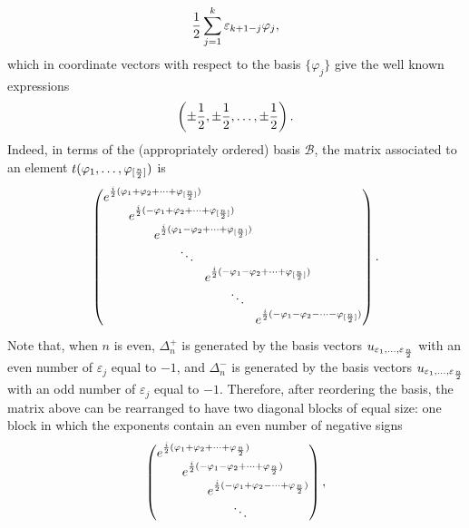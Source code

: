 \documentclass[pdftex]{sigma}
\numberwithin{equation}{section}
\begin{document}
\begin{gather*}{1\over 2}\sum_{j=1}^{k}\varepsilon_{k+1-j}\varphi_j,\end{gather*}
which in coordinate vectors with respect to the basis $\{\varphi_j\}$ give the well known expressions
\begin{gather*}\left(\pm{1\over 2},\pm{1\over 2},\dots,\pm{1\over 2}\right).\end{gather*}
Indeed, in terms of the (appropriately ordered) basis $\mathcal{B}$, the matrix associated to an element $t(\varphi_1,\dots,\varphi_{[{n\over 2}]})$ is
\begin{gather*}
\left(\begin{array}{@{}l@{}}
e^{{i\over 2}(\varphi_1+\varphi_2+\cdots+\varphi_{[{n\over 2}]})} \\
\qquad e^{{i\over 2}(-\varphi_1+\varphi_2+\cdots+\varphi_{[{n\over 2}]})} \\
\qquad\qquad e^{{i\over 2}(\varphi_1-\varphi_2+\cdots+\varphi_{[{n\over 2}]})} \\
\qquad\qquad\qquad \ddots \\
\qquad\qquad\qquad\qquad e^{{i\over 2}(-\varphi_1-\varphi_2+\cdots+\varphi_{[{n\over 2}]})} \\
\qquad\qquad\qquad\qquad\qquad \ddots \\
\qquad\qquad\qquad\qquad\qquad\qquad e^{{i\over 2}(-\varphi_1-\varphi_2-\cdots-\varphi_{[{n\over 2}]})}
\end{array}\right).
\end{gather*}
Note that, when $n$ is even, $\Delta_n^+$ is generated by the basis vectors $u_{\varepsilon_1,\dots,\varepsilon_{{n\over 2}}}$ with an even number
of $\varepsilon_j$ equal to $-1$, and $\Delta_n^-$ is generated by the basis vectors $u_{\varepsilon_1,\dots,\varepsilon_{{n\over 2}}}$ with an odd number of $\varepsilon_j$ equal to $-1$. Therefore, after reordering the basis, the matrix above can be rearranged to have two diagonal blocks of equal size: one block in which the exponents contain an even number of negative signs
\begin{gather*}
 \left(\begin{array}{@{}l@{}}
e^{{i\over 2}(\varphi_1+\varphi_2+\cdots+\varphi_{{n\over 2}})} \\
\qquad e^{{i\over 2}(-\varphi_1-\varphi_2+\cdots+\varphi_{{n\over 2}})} \\
\qquad\qquad e^{{i\over 2}(-\varphi_1+\varphi_2-\cdots+\varphi_{{n\over 2}})} \\
\qquad\qquad\qquad \ddots
 \end{array}\right),
\end{gather*}
\end{document}
